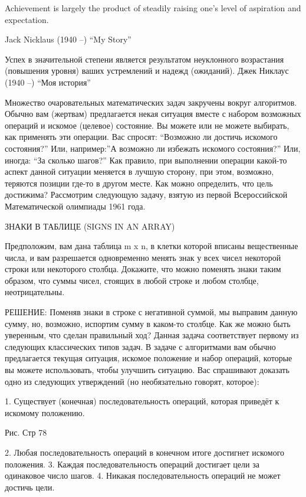 ﻿Achievement is largely the product of steadily raising one’s level of aspiration and expectation.


                                             Jack Nicklaus (1940 --) “My Story”


Успех в значительной степени является результатом неуклонного возрастания (повышения уровня) ваших устремлений и надежд (ожиданий).
                                              Джек Никлаус (1940 --) “Моя история”




 Множество очаровательных математических задач закручены вокруг алгоритмов. Обычно вам (жертвам) предлагается некая ситуация вместе с набором возможных операций и искомое (целевое) состояние. Вы можете или не можете выбирать, как применять эти операции. Вас спросят: “Возможно ли достичь искомого состояния?” Или, например:”А возможно ли избежать искомого состояния?” Или, иногда: “За сколько шагов?”
  Как правило, при выполнении операции какой-то аспект  данной ситуации меняется в лучшую сторону, при этом, возможно, теряются позиции где-то в другом месте. Как можно определить, что цель достижима?
   Рассмотрим следующую задачу, взятую из первой Всероссийской Математической олимпиады 1961 года.


ЗНАКИ В ТАБЛИЦЕ (SIGNS IN AN ARRAY)


Предположим, вам дана таблица m x n, в клетки которой вписаны вещественные числа, и вам разрешается одновременно менять знак у всех чисел некоторой строки или некоторого столбца. Докажите, что можно поменять знаки таким образом, что суммы чисел, стоящих в любой строке и любом столбце, неотрицательны.


РЕШЕНИЕ: Поменяв знаки в строке с негативной суммой, мы выправим данную сумму, но, возможно, испортим сумму в каком-то столбце. Как же можно быть уверенным, что сделан правильный ход?
    Данная задача соответствует первому  из следующих классических типов задач. В задаче с алгоритмами вам обычно предлагается текущая ситуация, искомое положение и набор операций, которые вы можете использовать, чтобы улучшить ситуацию. Вас спрашивают доказать одно из следующих утверждений (но необязательно говорят, которое):


1. Существует (конечная) последовательность операций, которая приведёт к искомому положению.


                                     Рис. Стр 78






2. Любая последовательность операций в конечном итоге достигнет искомого положения.
3. Каждая последовательность операций достигает цели за одинаковое число шагов.
4. Никакая последовательность операций  не может достичь цели.


